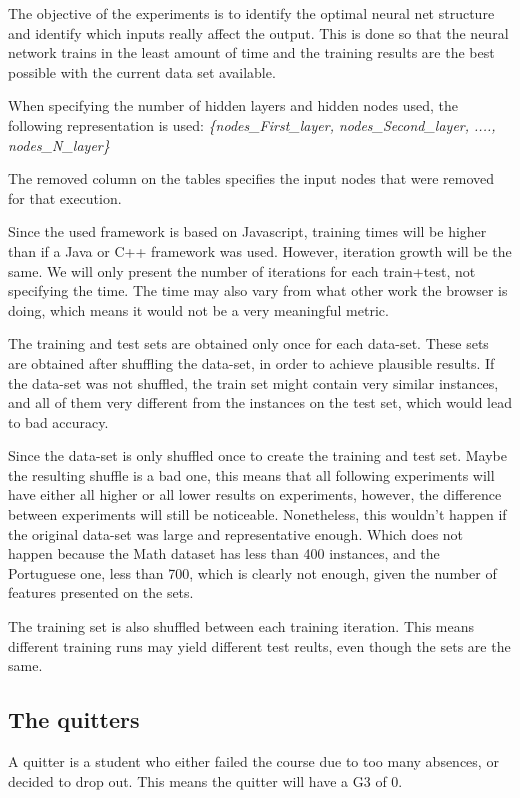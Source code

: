 \documentclass[11pt]{article}
\begin{document}
The objective of the experiments is to identify the optimal neural net structure and identify which inputs really affect the output. This is done so that the neural network trains in the least amount of time and the training results are the best possible with the current data set available.

When specifying the number of hidden layers and hidden nodes used, the following representation is used:
\textit{\{nodes\_First\_layer, nodes\_Second\_layer, ...., nodes\_N\_layer\}}

The removed column on the tables specifies the input nodes that were removed for that execution.

Since the used framework is based on Javascript, training times will be higher than if a Java or C++ framework was used. However, iteration growth will be the same. We will only present the number of iterations for each train+test, not specifying the time. The time may also vary from what other work the browser is doing, which means it would not be a very meaningful metric.

The training and test sets are obtained only once for each data-set. These sets are obtained after shuffling the data-set, in order to achieve plausible results. If the data-set was not shuffled, the train set might contain very similar instances, and all of them very different from the instances on the test set, which would lead to bad accuracy.

Since the data-set is only shuffled once to create the training and test set. Maybe the resulting shuffle is a bad one, this means that all following experiments will have either all higher or all lower results on experiments, however, the difference between experiments will still be noticeable. Nonetheless, this wouldn't happen if the original data-set was large and representative enough. Which does not happen because the Math dataset has less than 400 instances, and the Portuguese one, less than 700, which is clearly not enough, given the number of features presented on the sets.

The training set is also shuffled between each training iteration. This means different training runs may yield different test reults, even though the sets are the same.

\subsection{The quitters}
A quitter is a student who either failed the course due to too many absences, or decided to drop out. This means the quitter will have a G3 of 0.
\end{document}

